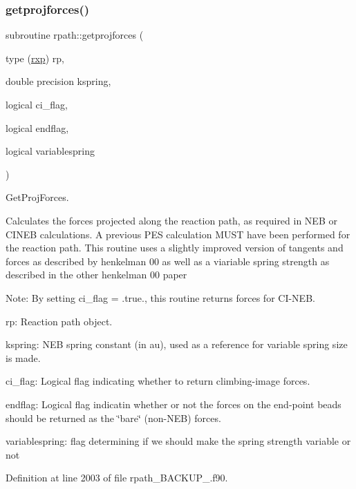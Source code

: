 \subsubsection{\texorpdfstring{getprojforces()}{getprojforces()}}
{\footnotesize\ttfamily subroutine rpath\+::getprojforces (\begin{DoxyParamCaption}\item[{type (\mbox{\hyperlink{structrpath_1_1rxp}{rxp}})}]{rp,  }\item[{double precision}]{kspring,  }\item[{logical}]{ci\+\_\+flag,  }\item[{logical}]{endflag,  }\item[{logical}]{variablespring }\end{DoxyParamCaption})}



Get\+Proj\+Forces. 

Calculates the forces projected along the reaction path, as required in N\+EB or C\+I\+N\+EB calculations. A previous P\+ES calculation M\+U\+ST have been performed for the reaction path. This routine uses a slightly improved version of tangents and forces as described by henkelman 00 as well as a viariable spring strength as described in the other henkelman 00 paper

Note\+: By setting ci\+\_\+flag = .true., this routine returns forces for C\+I-\/\+N\+EB.


\begin{DoxyItemize}
\item rp\+: Reaction path object.
\item kspring\+: N\+EB spring constant (in au), used as a reference for variable spring size is made.
\item ci\+\_\+flag\+: Logical flag indicating whether to return climbing-\/image forces.
\item endflag\+: Logical flag indicatin whether or not the forces on the end-\/point beads should be returned as the \char`\"{}bare\char`\"{} (non-\/\+N\+EB) forces.
\item variablespring\+: flag determining if we should make the spring strength variable or not 
\end{DoxyItemize}

Definition at line 2003 of file rpath\+\_\+\+B\+A\+C\+K\+U\+P\+\_.\+f90.

